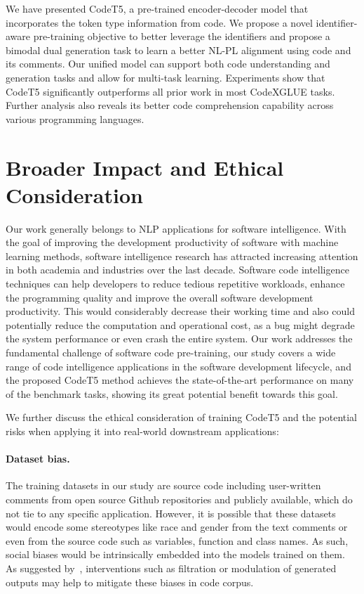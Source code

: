 \documentclass[11pt]{article}
\begin{document}
We have presented CodeT5, a pre-trained encoder-decoder model that incorporates the token type information from code. We propose a novel identifier-aware pre-training objective to better leverage the identifiers and propose a bimodal dual generation task to learn a better NL-PL alignment using code and its comments. 
Our unified model can support both code understanding and generation tasks and allow for multi-task learning.
Experiments show that CodeT5 significantly outperforms all prior work in most CodeXGLUE tasks. 
Further analysis also reveals its better code comprehension capability across various programming languages.

 \section*{Broader Impact and Ethical Consideration}

Our work generally belongs to NLP applications for software intelligence. With the goal of improving the development productivity of software with machine learning methods, software intelligence research has attracted increasing attention in both academia and industries over the last decade.
Software code intelligence techniques can help developers to reduce tedious repetitive workloads, enhance the programming quality and improve the overall software development productivity. This would considerably decrease their working time and also could potentially reduce the computation and operational cost, as a bug might degrade the system performance or even crash the entire system. 
Our work addresses the fundamental challenge of software code pre-training, our study covers a wide range of code intelligence applications in the software development lifecycle, and the proposed CodeT5 method achieves the state-of-the-art performance on many of the benchmark tasks, showing its great potential benefit towards this goal.

We further discuss the ethical consideration of training CodeT5 and the potential risks when applying it into real-world downstream applications:

\paragraph{Dataset bias.} The training datasets in our study are source code including user-written comments from open source Github repositories and publicly available, which do not tie to any specific application. However, it is possible that these datasets would encode some stereotypes like race and gender from the text comments or even from the source code such as  variables, function and class names. As such,  social biases would be intrinsically embedded into the models trained on them.
As suggested by~\citet{DBLP:journals/corr/abs-2107-03374}, interventions such as filtration or modulation of generated outputs may help to mitigate these biases in code corpus.
\end{document}
